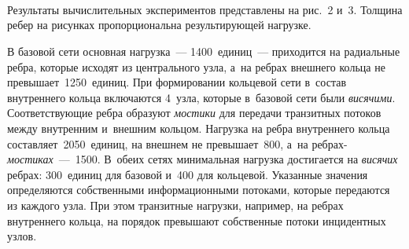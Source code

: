 \begin{multicols}{2}
\begin{figure*}[b] %
\vspace*{-4pt}
\begin{center}
   \mbox{%
\epsfxsize=153.408mm
}
\end{center}
\vspace*{-9pt}
%
\vspace*{9pt}
\begin{center}
   \mbox{%
\epsfxsize=153.476mm
}
\end{center}
\vspace*{-9pt}
\vspace*{9pt}
\begin{center}
   \mbox{%
\epsfxsize=162.263mm
}
\end{center}
\vspace*{-9pt}
\end{figure*}
    

Результаты вычислительных экспериментов представлены на рис.~2 и~3. 
Толщина ребер на рисунках пропорциональна результирующей нагрузке.

В базовой сети основная нагрузка~--- 1400~единиц~--- приходится на радиальные ребра, которые исходят из центрального узла, 
а~на ребрах внешнего кольца не превышает~1250~единиц. При формировании кольцевой сети в~состав внутреннего кольца включаются 4~узла, которые 
в~базовой сети были \textit{висячими}. Соответствующие ребра образуют \textit{мостики}  для передачи транзитных потоков между внутренним и~внешним кольцом. 
Нагрузка на ребра внут\-рен\-не\-го кольца составляет~2050~единиц, на внеш\-нем не превышает~800, а~на реб\-рах-\textit{мос\-ти\-ках}~---~1500. 
В~обеих сетях минимальная на\-груз\-ка достигается на \textit{висячих} ребрах: 300~единиц для базовой и~400 для кольцевой. 
Указанные значения определяются  собственными информационными  потоками, которые передаются из каждого узла. 
При этом транзитные нагрузки, например,  на ребрах внут\-рен\-не\-го кольца, на порядок превышают собственные потоки инцидентных узлов.






\end{multicols}
